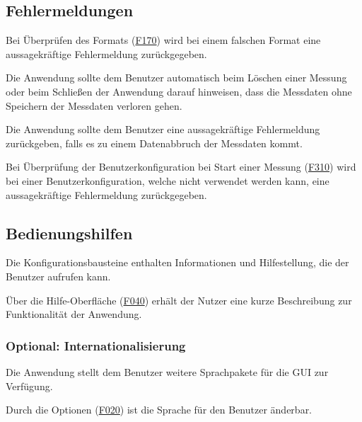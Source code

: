\documentclass[parskip=full]{scrartcl}
\begin{document}
\subsection{Fehlermeldungen}

\begin{description}
\hypertarget{link-f430}{\item[F430]} Bei Überprüfen des Formats (\hyperlink{link-f170}{F170}) wird bei einem falschen Format eine aussagekräftige Fehlermeldung zurückgegeben.
\hypertarget{link-f440}{\item[F440]} Die Anwendung sollte dem Benutzer automatisch beim Löschen einer Messung oder beim Schließen der Anwendung darauf hinweisen, dass die Messdaten ohne Speichern der Messdaten verloren gehen.
\hypertarget{link-f450}{\item[F450]} Die Anwendung sollte dem Benutzer eine aussagekräftige Fehlermeldung zurückgeben, falls es zu einem Datenabbruch der Messdaten kommt.
\hypertarget{link-f460}{\item[F460]} Bei Überprüfung der \gls{Benutzerkonfiguration} bei Start einer Messung (\hyperlink{link-f310}{F310}) wird bei einer \gls{Benutzerkonfiguration}, welche nicht verwendet werden kann, eine aussagekräftige Fehlermeldung zurückgegeben.

\end{description}

\subsection{Bedienungshilfen}

\begin{description}

\hypertarget{link-f470}{\item[F470]} Die Konfigurationsbausteine enthalten Informationen und Hilfestellung, die der Benutzer aufrufen kann.
\hypertarget{link-f480}{\item[F480]} Über die Hilfe-Oberfläche (\hyperlink{link-f040}{F040}) erhält der Nutzer eine kurze Beschreibung zur Funktionalität der Anwendung.

\end{description}

\subsubsection{Optional: Internationalisierung}

\begin{description}

\hypertarget{link-f490}{\item[(opt.) F490]} Die Anwendung stellt dem Benutzer weitere Sprachpakete für die \gls{GUI} zur Verfügung.
\hypertarget{link-f500}{\item[(opt.) F500]} Durch die Optionen (\hyperlink{link-f020}{F020}) ist die Sprache für den Benutzer änderbar.

\end{description}
\end{document}
